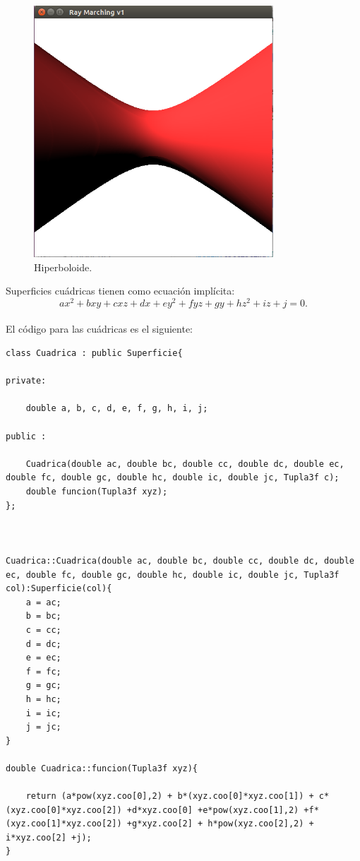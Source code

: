 \begin{figure}[h]
	\begin{center}
		\includegraphics[width=0.8\textwidth]{imagenes/cuadrica.png}
	\end{center}
	\caption{Hiperboloide.}
	\label{fig:etiq_123}
\end{figure}


Superficies cuádricas tienen como ecuación implícita:
${ }$\\
\[
ax^2 + bxy + cxz +dx +ey^2 +fyz +gy + hz^2 + iz +j = 0.
\]
${ }$\\

El código para las cuádricas es el siguiente:
${ }$\\

\begin{lstlisting}[style=Consola]
class Cuadrica : public Superficie{

private:

	double a, b, c, d, e, f, g, h, i, j;

public :

	Cuadrica(double ac, double bc, double cc, double dc, double ec, double fc, double gc, double hc, double ic, double jc, Tupla3f c);
	double funcion(Tupla3f xyz);
};



Cuadrica::Cuadrica(double ac, double bc, double cc, double dc, double ec, double fc, double gc, double hc, double ic, double jc, Tupla3f col):Superficie(col){
	a = ac;
	b = bc;
	c = cc;
	d = dc;
	e = ec;
	f = fc;
	g = gc;
	h = hc;
	i = ic;
	j = jc;
}

double Cuadrica::funcion(Tupla3f xyz){

	return (a*pow(xyz.coo[0],2) + b*(xyz.coo[0]*xyz.coo[1]) + c*(xyz.coo[0]*xyz.coo[2]) +d*xyz.coo[0] +e*pow(xyz.coo[1],2) +f*(xyz.coo[1]*xyz.coo[2]) +g*xyz.coo[2] + h*pow(xyz.coo[2],2) + i*xyz.coo[2] +j);
}
\end{lstlisting}





